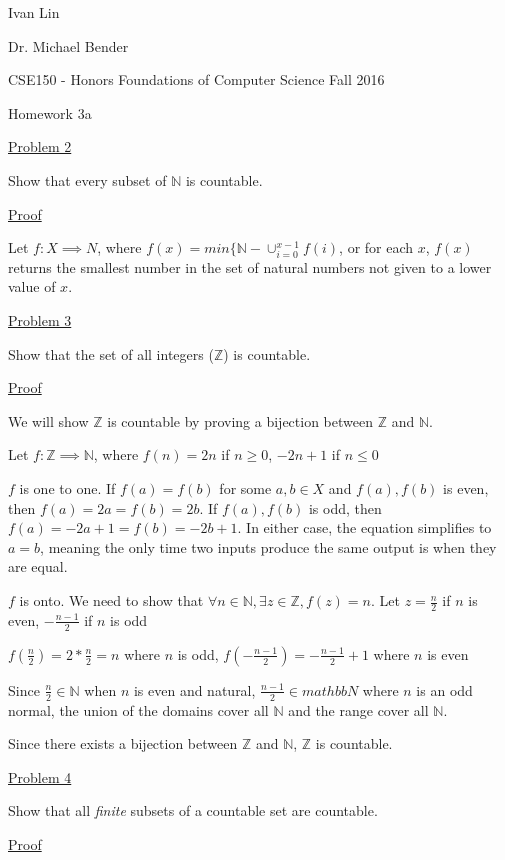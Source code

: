 \documentclass{article}
\begin{document}
Ivan Lin

Dr. Michael Bender

CSE150 - Honors Foundations of Computer Science Fall 2016

\begin{center}
Homework 3a
\end{center}

\underline{Problem 2}

Show that every subset of $\mathbb{N}$ is countable.

\underline{Proof}

Let $f: X\implies {N}$, where $f(x)=min\{\mathbb{N}-\cup_{i=0}^{x-1}f(i)$, or for each $x$, $f(x)$ returns the smallest number in the set of natural numbers not given to a lower value of $x$.

\underline{Problem 3}

Show that the set of all integers ($\mathbb{Z}$) is countable.

\underline{Proof}

We will show $\mathbb{Z}$ is countable by proving a bijection between $\mathbb{Z}$ and $\mathbb{N}$.

Let $f: \mathbb{Z} \implies \mathbb{N}$, where $f(n)=2n$ if $n \geq 0$, $-2n+1$ if $n \leq 0$

$f$ is one to one. If $f(a)=f(b)$ for some $a,b\in X$ and $f(a),f(b)$ is even, then $f(a)=2a=f(b)=2b$. If $f(a),f(b)$ is odd, then $f(a)=-2a+1=f(b)=-2b+1$. In either case, the equation simplifies to $a=b$, meaning the only time two inputs produce the same output is when they are equal.

$f$ is onto. We need to show that $\forall n \in \mathbb{N}, \exists z \in \mathbb{Z}, f(z)=n$. Let $z=\frac{n}{2}$ if $n$ is even, $-\frac{n-1}{2}$ if $n$ is odd

$f(\frac{n}{2})=2*\frac{n}{2}=n$ where $n$ is odd, $f(-\frac{n-1}{2})=-\frac{n-1}{2}+1$ where $n$ is even

Since $\frac{n}{2}\in \mathbb{N}$ when $n$ is even and natural, $\frac{n-1}{2}\in mathbb{N}$ where $n$ is an odd normal, the union of the domains cover all $\mathbb{N}$ and the range cover all $\mathbb{N}$.

Since there exists a bijection between $\mathbb{Z}$ and $\mathbb{N}$, $\mathbb{Z}$ is countable.

\underline{Problem 4}

Show that all \textit{finite} subsets of a countable set are countable.

\underline{Proof}
\end{document}
